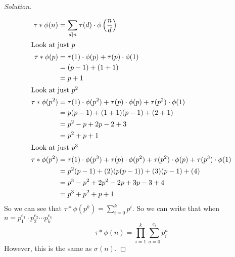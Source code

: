 \documentclass[11pt]{article}
\newenvironment{solution}
  {\renewcommand\qedsymbol{$~$}\begin{proof}[Solution]$ $\par\nobreak\ignorespaces}
  {\end{proof}}
\begin{document}
\begin{solution}
  \begin{align*}
    \tau * \phi(n)   & = \sum_{d|n} \tau(d) \cdot \phi\left(\frac{n}{d}\right)                                                   \\
    \intertext{Look at just $p$}
    \tau * \phi(p)   & =  \tau(1) \cdot \phi(p) + \tau(p) \cdot \phi(1)                                                          \\
                     & = (p-1) + (1+1)                                                                                           \\
                     & = p + 1                                                                                                   \\
    \intertext{Look at just $p^2$}
    \tau * \phi(p^2) & =  \tau(1) \cdot \phi(p^2) +\tau(p) \cdot \phi(p)  +  \tau(p^2) \cdot \phi(1)                             \\
                     & = p(p-1) + (1+1)(p-1) + (2+1)                                                                             \\
                     & = p^2-p + 2p-2 + 3                                                                                        \\
                     & = p^2+p+1                                                                                                 \\
    \intertext{Look at just $p^3$}
    \tau * \phi(p^2) & =  \tau(1) \cdot \phi(p^3) +\tau(p) \cdot \phi(p^2) + \tau(p^2) \cdot \phi(p)  +  \tau(p^3) \cdot \phi(1) \\
                     & = p^2(p-1) + (2)(p(p-1)) + (3)(p-1) + (4)                                                                 \\
                     & = p^3-p^2 + 2p^2-2p + 3p-3 + 4                                                                            \\
                     & = p^3+p^2+p+1                                                                                             \\
  \end{align*}
  So we can see that $\tau * \phi(p^k)=\sum_{i=0}^k p^{i}$. So we can write that when $n=p_1^{e_1}\cdot p_2^{e_2}\cdots p_k^{e_k}$
  \[
    \tau * \phi(n) = \prod_{i=1}^{k} \sum_{a=0}^{e_i} p_i^{a}
  \]
  However, this is the same as $\sigma(n)$.
\end{solution}
\end{document}
